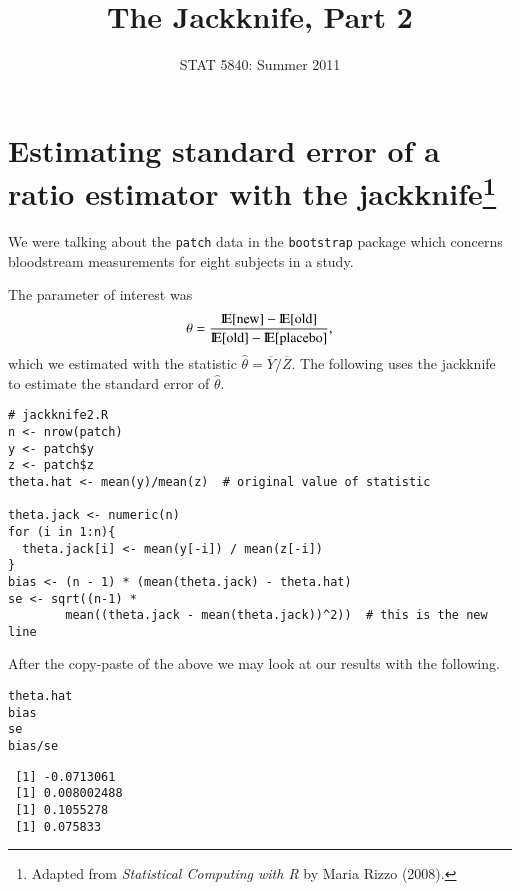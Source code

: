 \documentclass[11pt,english]{article}
\title{The Jackknife, Part 2}
\date{STAT 5840: Summer 2011}
\begin{document}
\maketitle

\thispagestyle{empty}

\section*{Estimating standard error of a ratio estimator with the jackknife\protect\footnote{Adapted from \emph{Statistical Computing with R} by Maria Rizzo (2008). }}
\label{sec-1}

We were talking about the \texttt{patch} data in the \texttt{bootstrap} package which concerns bloodstream measurements for eight subjects in a study. 


The parameter of interest was
\[
\theta = \frac{\mathrm{I\hspace{-1.5pt}E}[\mathrm{new}] - \mathrm{I\hspace{-1.5pt}E}[\mathrm{old}]}{\mathrm{I\hspace{-1.5pt}E}[\mathrm{old}] - \mathrm{I\hspace{-1.5pt}E}[\mathrm{placebo}]},
\]
which we estimated with the statistic \(\hat{\theta} = \overline{Y}/\overline{Z}\).  The following uses the jackknife to estimate the standard error of $\hat{\theta}$.

\begin{verbatim}
# jackknife2.R
n <- nrow(patch)
y <- patch$y
z <- patch$z
theta.hat <- mean(y)/mean(z)  # original value of statistic

theta.jack <- numeric(n)
for (i in 1:n){
  theta.jack[i] <- mean(y[-i]) / mean(z[-i])
}
bias <- (n - 1) * (mean(theta.jack) - theta.hat)
se <- sqrt((n-1) *
        mean((theta.jack - mean(theta.jack))^2))  # this is the new line
\end{verbatim}

After the copy-paste of the above we may look at our results with the following.
\begin{verbatim}
theta.hat
bias
se
bias/se
\end{verbatim}

\begin{verbatim}
 [1] -0.0713061
 [1] 0.008002488
 [1] 0.1055278
 [1] 0.075833
\end{verbatim}
\end{document}
